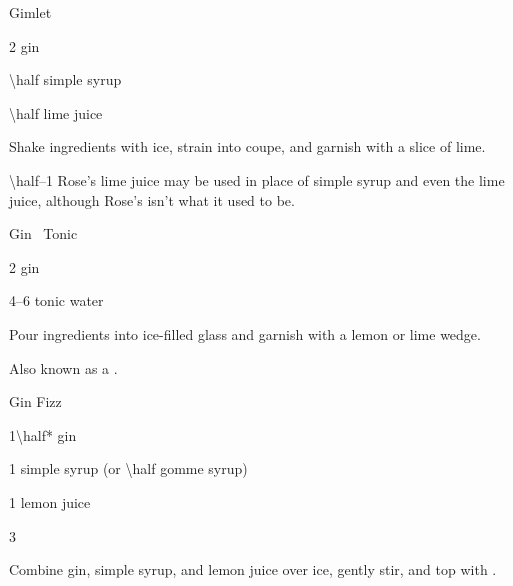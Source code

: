 \begin{Cocktail}{Gimlet}
  \begin{Ingredients}
  \item \SI{2}{\oz} gin
  \item \SI{\half}{\oz} simple syrup
  \item \SI{\half}{\oz} lime juice
  \end{Ingredients}
  
  \begin{Instructions}
	Shake ingredients with ice, strain into coupe, and garnish with a slice of lime.
	
	\SIrange{\half}{1}{\oz} Rose's lime juice may be used in place of simple syrup and even the lime juice, although Rose's isn't what it used to be.
  \end{Instructions}
\end{Cocktail}

\begin{Cocktail}{Gin \And\ Tonic}
  \begin{Ingredients}
  \item \SI{2}{\oz} gin
  \item \SIrange{4}{6}{\oz} tonic water
  \end{Ingredients}
  
  \begin{Instructions}
	Pour ingredients into ice-filled glass and garnish with a lemon or lime wedge.
	
	Also known as a .
  \end{Instructions}
\end{Cocktail}

\begin{Cocktail}{Gin Fizz}
  \begin{Ingredients}
  \item \SI{1\half*}{\oz} gin
  \item \SI{1}{\oz} simple syrup (or \SI{\half}{\oz} gomme syrup)
  \item \SI{1}{\oz} lemon juice
  \item \SI{3}{\oz} \soda
  \end{Ingredients}
  
  \begin{Instructions}
	Combine gin, simple syrup, and lemon juice over ice, gently stir, and top with \soda.
  \end{Instructions}
\end{Cocktail}

